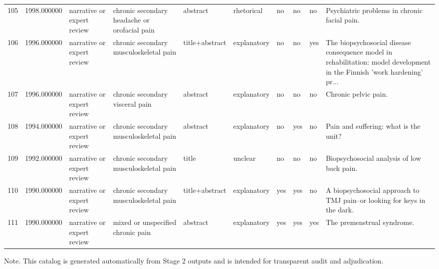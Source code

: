 \begin{longtable}{p{0.7cm}p{0.7cm}p{1.2cm}p{1.9cm}p{1.3cm}p{1.5cm}p{0.55cm}p{0.55cm}p{0.55cm}p{3.2cm}}
105 & 1998.000000 & narrative or expert review & chronic secondary headache or orofacial pain & abstract & rhetorical & no & no & no & Psychiatric problems in chronic facial pain. \\
106 & 1996.000000 & narrative or expert review & chronic secondary musculoskeletal pain & title+abstract & explanatory & no & no & yes & The biopsychosocial disease consequence model in rehabilitation: model development in the Finnish 'work hardening' pr... \\
107 & 1996.000000 & narrative or expert review & chronic secondary visceral pain & abstract & explanatory & no & no & no & Chronic pelvic pain. \\
108 & 1994.000000 & narrative or expert review & chronic secondary musculoskeletal pain & abstract & explanatory & no & yes & no & Pain and suffering: what is the unit? \\
109 & 1992.000000 & narrative or expert review & chronic secondary musculoskeletal pain & title & unclear & no & no & no & Biopsychosocial analysis of low back pain. \\
110 & 1990.000000 & narrative or expert review & chronic secondary musculoskeletal pain & title+abstract & explanatory & yes & yes & no & A biopsychosocial approach to TMJ pain--or looking for keys in the dark. \\
111 & 1990.000000 & narrative or expert review & mixed or unspecified chronic pain & abstract & explanatory & yes & yes & yes & The premenstrual syndrome. \\
\end{longtable}

\par\vspace{2pt}\footnotesize Note. This catalog is generated automatically from Stage 2 outputs and is intended for transparent audit and adjudication.\n\normalsize
